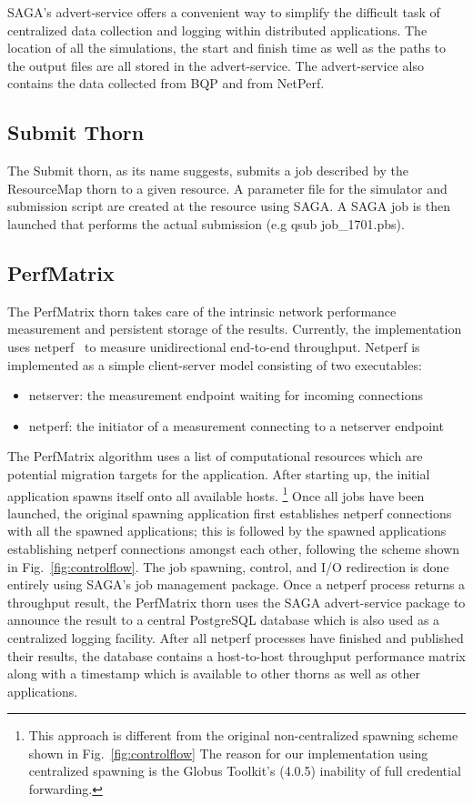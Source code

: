 \documentclass[conference,final]{IEEEtran}
\begin{document}
SAGA's advert-service offers a convenient way to simplify the
difficult task of centralized data collection and logging within
distributed applications. The location of all the 
simulations, the start and finish time as well as the paths to the
output files are all stored in the advert-service. The advert-service
also contains the data collected from BQP and from NetPerf.


\subsection{Submit Thorn} 
The Submit thorn, as its name suggests, submits a job described by the
ResourceMap thorn to a given resource. A parameter file for the
simulator and submission script are created at the resource
using SAGA. A SAGA job is then launched that performs the actual
submission (e.g qsub job\_1701.pbs).

\subsection{PerfMatrix} The PerfMatrix thorn takes care of the
intrinsic network performance measurement and persistent storage of
the results. Currently, the implementation uses
netperf~\cite{netperf_web} to measure unidirectional end-to-end
throughput. Netperf is implemented as a simple client-server model
consisting of two executables:
\begin{itemize}
\item{netserver: the measurement endpoint waiting for incoming connections}
\item{netperf: the initiator of a measurement connecting to a netserver endpoint}
\end{itemize}

The PerfMatrix algorithm uses a list of computational resources which
are potential migration targets for the application. After starting
up, the initial application spawns itself onto all available hosts.
\footnote{This approach is different from the original non-centralized
  spawning scheme shown in Fig.~\ref{fig:controlflow} The reason for
  our implementation using centralized spawning is the Globus
  Toolkit's (4.0.5) inability of full credential forwarding.} Once all
jobs have been launched, the original spawning application first
establishes netperf connections with all the spawned applications;
this is followed by the spawned applications establishing netperf
connections amongst each other, following the scheme shown in
Fig.~\ref{fig:controlflow}.  The job spawning, control, and I/O
redirection is done entirely using SAGA's job management package.
Once a netperf process returns a throughput result, the PerfMatrix
thorn uses the SAGA advert-service package to announce the result to a
central PostgreSQL database which is also used as a centralized
logging facility. After all netperf processes have finished and
published their results, the database contains a host-to-host
throughput performance matrix along with a timestamp which is
available to other thorns as well as other applications.
\end{document}
